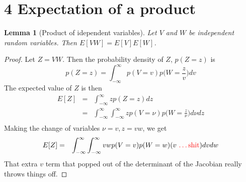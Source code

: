\documentclass[11pt]{article}
\newtheorem{lemma}{Lemma}[section]
\begin{document}
\section*{4 Expectation of a product}
\begin{lemma}[Product of idependent variables]
    Let $V$ and $W$ be independent random variables. Then $E[VW] = E[V]E[W]$.
\end{lemma}
\begin{proof}
    Let $Z=VW$. Then the probability density of $Z$, $p(Z=z)$ is
    \begin{equation}
        p(Z=z) = \int_{-\infty}^{\infty}p(V=v)p\bigg(W=\frac{z}{v}\bigg)dv
        \label{eqn: indep_prod_density}
    \end{equation}
    The expected value of $Z$ is then
    \begin{eqnarray}
        E[Z] &=& \int_{-\infty}^{\infty} zp(Z=z) dz \nonumber \\
            &=& \int_{-\infty}^{\infty} \int_{-\infty}^{\infty}z p(V=\nu)p\bigg(W=\frac{z}{\nu}\bigg)d\nu dz \\
        \label{eqn: full_expected_indep_prod}
    \end{eqnarray}
    Making the change of variables $\nu = v, z = vw$, we get
    \begin{eqnarray}
        E[Z] &=& \int_{-\infty}^{\infty} \int_{-\infty}^{\infty}
            vwp(V=v)p(W=w) (v \text{ \color{red}{\dots shit}}) dv dw
    \end{eqnarray}
    That extra $v$ term that popped out of the determinant of the Jacobian really throws things off.
\end{proof}

%
%

\end{document}
